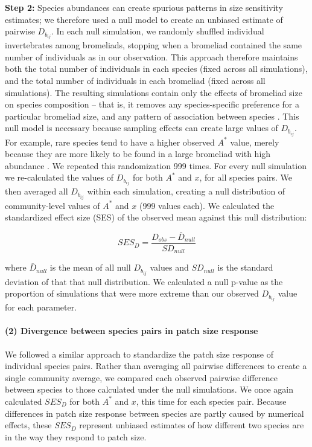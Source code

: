 \textbf{Step 2:} Species abundances can create spurious patterns in size
sensitivity estimates; we therefore used a null model to create an
unbiased estimate of pairwise \(D_{b_{ij}}\). In each null simulation,
we randomly shuffled individual invertebrates among bromeliads, stopping
when a bromeliad contained the same number of individuals as in our
observation. This approach therefore maintains both the total number of
individuals in each species (fixed across all simulations), and the
total number of individuals in each bromeliad (fixed across all
simulations). The resulting simulations contain only the effects of
bromeliad size on species composition -- that is, it removes any
species-specific preference for a particular bromeliad size, and any
pattern of association between species \citep{Ulrich2012}. This null
model is necessary because sampling effects can create large values of
\(D_{b_{ij}}\). For example, rare species tend to have a higher observed
\(A^{*}\) value, merely because they are more likely to be found in a
large bromeliad with high abundance \citep{Srivastava2008}. We repeated
this randomization 999 times. For every null simulation we re-calculated
the values of \(D_{b_{ij}}\) for both \(A^{*}\) and \(x\), for all
species pairs. We then averaged all \(D_{b_{ij}}\) within each
simulation, creating a null distribution of community-level values of
\(A^{*}\) and \(x\) (999 values each). We calculated the standardized
effect size (SES) of the observed mean against this null distribution:

\[SES_{D} = \frac{D_{obs} - \bar{D}_{null}}{SD_{null}}\]

where \(\bar{D}_{null}\) is the mean of all null \(D_{b_{ij}}\) values
and \(SD_{null}\) is the standard deviation of that that null
distribution. We calculated a null p-value as the proportion of
simulations that were more extreme than our observed \(D_{b_{ij}}\)
value for each parameter.

\paragraph{(2) Divergence between species pairs in patch size
response}\label{divergence-between-species-pairs-in-patch-size-response}

We followed a similar approach to standardize the patch size response of
individual species pairs. Rather than averaging all pairwise differences
to create a single community average, we compared each observed pairwise
difference between species to those calculated under the null
simulations. We once again calculated \(SES_{D}\) for both \(A^{*}\) and
\(x\), this time for each species pair. Because differences in patch
size response between species are partly caused by numerical effects,
these \(SES_{D}\) represent unbiased estimates of how different two
species are in the way they respond to patch size.

